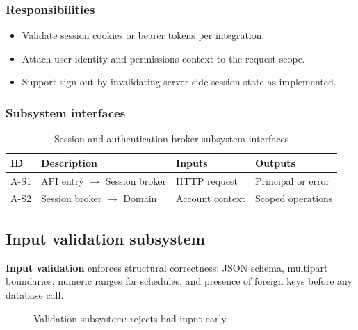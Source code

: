 \subsubsection{Responsibilities}
\begin{itemize}
  \item Validate session cookies or bearer tokens per integration.
  \item Attach user identity and permissions context to the request scope.
  \item Support sign-out by invalidating server-side session state as implemented.
\end{itemize}

\subsubsection{Subsystem interfaces}
\begin{table}[H]
\centering
\small
\begin{tabular}{|p{0.9cm}|p{3.4cm}|p{3.0cm}|p{3.5cm}|}
\hline
\textbf{ID} & \textbf{Description} & \textbf{Inputs} & \textbf{Outputs} \\
\hline
A-S1 & API entry $\rightarrow$ Session broker & HTTP request & Principal or error \\
\hline
A-S2 & Session broker $\rightarrow$ Domain & Account context & Scoped operations \\
\hline
\end{tabular}
\caption{Session and authentication broker subsystem interfaces}
\end{table}

\subsection{Input validation subsystem}

\textbf{Input validation} enforces structural correctness: JSON schema, multipart boundaries, numeric ranges for schedules, and presence of foreign keys before any database call.

\begin{figure}[H]
\centering
{}
\caption{Validation subsystem: rejects bad input early.}
\label{fig:app-val}
\end{figure}

